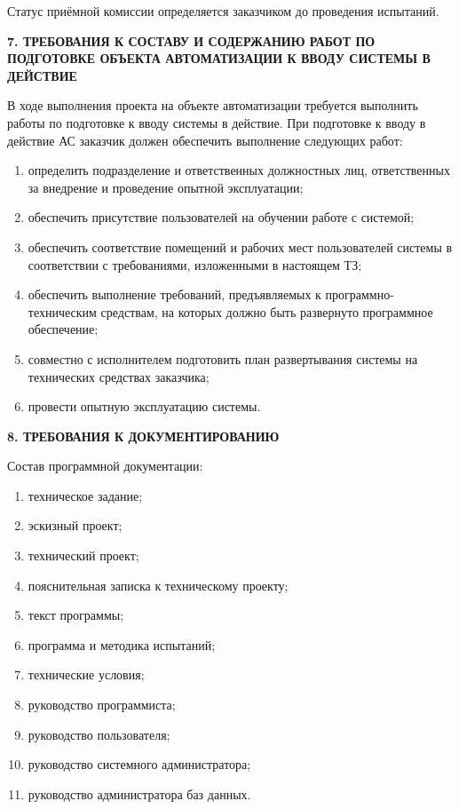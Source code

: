 Статус приёмной комиссии определяется заказчиком до проведения
испытаний.

\newpage
\begin{center}
  \textbf{\large 7. ТРЕБОВАНИЯ К СОСТАВУ И СОДЕРЖАНИЮ РАБОТ ПО ПОДГОТОВКЕ ОБЪЕКТА АВТОМАТИЗАЦИИ К ВВОДУ СИСТЕМЫ В ДЕЙСТВИЕ}
\end{center}

В ходе выполнения проекта на объекте автоматизации требуется
выполнить работы по подготовке к вводу системы в действие. При подготовке
к вводу в действие АС заказчик должен обеспечить выполнение следующих
работ:

\begin{enumerate}
\item определить подразделение и ответственных должностных лиц, ответственных за внедрение и проведение опытной эксплуатации;
\item обеспечить присутствие пользователей на обучении работе с системой;
\item обеспечить соответствие помещений и рабочих мест пользователей системы в соответствии с требованиями, изложенными в настоящем ТЗ;
\item обеспечить выполнение требований, предъявляемых к программно-техническим средствам, на которых должно быть развернуто программное обеспечение;
\item совместно с исполнителем подготовить план развертывания системы на технических средствах заказчика;
\item провести опытную эксплуатацию системы.
\end{enumerate}

\newpage
\begin{center}
  \textbf{\large 8. ТРЕБОВАНИЯ К ДОКУМЕНТИРОВАНИЮ}
\end{center}

Состав программной документации:

\begin{enumerate}
\item техническое задание;
\item эскизный проект;
\item технический проект;
\item пояснительная записка к техническому проекту;
\item текст программы;
\item программа и методика испытаний;
\item технические условия;
\item руководство программиста;
\item руководство пользователя;
\item руководство системного администратора;
\item руководство администратора баз данных.
\end{enumerate}


